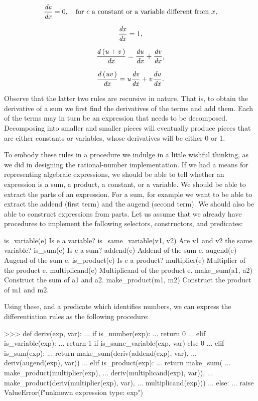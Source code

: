 $$
\frac{{\it dc}}{{\it dx}} = 0,
\quad {\rm for\ } c\ {\rm a\ constant\ or\ a\ variable\ different\ from\ } x,
$$

$$
\frac{{\it dx}}{{\it dx}} = 1,
$$

$$
\frac{{\it d\,(u + v\,)}}{{\it dx}}
=
\frac{{\it du}}{{\it dx}} + \frac{{\it dv}}{{\it dx}},
$$

$$
\frac{{\it d\,(uv\,)}}{{\it dx}}
=
u \frac{{\it dv}}{{\it dx}} + v \frac{{\it du}}{{\it dx}}.
$$

\noindent
Observe that the latter two rules are recursive in nature.  That is, to obtain
the derivative of a sum we first find the derivatives of the terms and add
them.  Each of the terms may in turn be an expression that needs to be
decomposed.  Decomposing into smaller and smaller pieces will eventually
produce pieces that are either constants or variables, whose derivatives will
be either 0 or 1.

To embody these rules in a procedure we indulge in a little wishful thinking,
as we did in designing the rational-number implementation.  If we had a means
for representing algebraic expressions, we should be able to tell whether an
expression is a sum, a product, a constant, or a variable.  We should be able
to extract the parts of an expression.  For a sum, for example we want to be
able to extract the addend (first term) and the augend (second term).  We
should also be able to construct expressions from parts.  Let us assume that we
already have procedures to implement the following selectors, constructors, and
predicates:

\begin{syntaxForm}
is_variable(e)           Is e a variable?
is_same_variable(v1, v2) Are v1 and v2 the same variable?
is_sum(e)                Is e a sum?
addend(e)                Addend of the sum e.
augend(e)                Augend of the sum e.
is_product(e)            Is e a product?
multiplier(e)            Multiplier of the product e.
multiplicand(e)          Multiplicand of the product e.
make_sum(a1, a2)         Construct the sum of a1 and a2.
make_product(m1, m2)     Construct the product of m1 and m2.
\end{syntaxForm}

\noindent
Using these, and a predicate  which identifies numbers, we can
express the differentiation rules as the following procedure:

\begin{codeBlock}
>>> def deriv(exp, var):
...     if is_number(exp):
...         return 0
...     elif is_variable(exp):
...         return 1 if is_same_variable(exp, var) else 0
...     elif is_sum(exp):
...         return make_sum(deriv(addend(exp), var),
...                         deriv(augend(exp), var))
...     elif is_product(exp):
...         return make_sum(
...             make_product(multiplier(exp),
...                          deriv(multiplicand(exp), var)),
...             make_product(deriv(multiplier(exp), var),
...                          multiplicand(exp)))
...     else:
...         raise ValueError(f"unknown expression type: {exp}")
\end{codeBlock}

